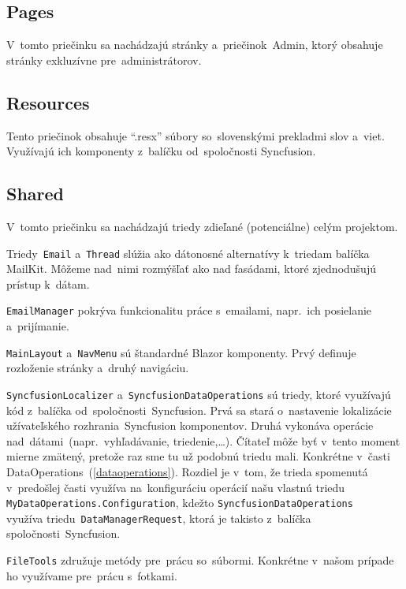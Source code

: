 \subsection{Pages}

V~tomto priečinku sa nachádzajú stránky a~priečinok~Admin, ktorý obsahuje stránky exkluzívne pre~administrátorov.

\subsection{Resources}

Tento priečinok obsahuje ``.resx'' súbory so~slovenskými prekladmi slov a~viet. Využívajú ich komponenty z~balíčku od~spoločnosti Syncfusion.

\subsection{Shared}

V~tomto priečinku sa nachádzajú triedy zdieľané (potenciálne) celým projektom.

Triedy~\verb|Email| a~\verb|Thread| slúžia ako dátonosné alternatívy k~triedam balíčka MailKit. Môžeme nad~nimi rozmýšľať ako nad fasádami, ktoré zjednodušujú prístup k~dátam.

\verb|EmailManager| pokrýva funkcionalitu práce s~emailami, napr.~ich posielanie a~prijímanie.

\verb|MainLayout| a~\verb|NavMenu| sú štandardné Blazor komponenty. Prvý definuje rozloženie stránky a~druhý navigáciu.

\verb|SyncfusionLocalizer| a~\verb|SyncfusionDataOperations| sú triedy, ktoré využívajú kód z~balíčka od~spoločnosti~Syncfusion. Prvá sa stará o~nastavenie lokalizácie užívateľského rozhrania~Syncfusion komponentov. Druhá vykonáva operácie nad~dátami~(napr.~vyhľadávanie, triedenie,\dots). Čítateľ môže byť v~tento moment mierne zmätený, pretože raz sme tu už podobnú triedu mali. Konkrétne v~časti DataOperations~(\ref{dataoperations}). Rozdiel je v~tom, že trieda spomenutá v~predošlej časti využíva na~konfiguráciu operácií našu vlastnú triedu\\\verb|MyDataOperations.Configuration|, kdežto \verb|SyncfusionDataOperations|\\využíva triedu~\verb|DataManagerRequest|, ktorá je takisto z~balíčka spoločnosti~Syncfusion.

\verb|FileTools| združuje metódy pre~prácu so~súbormi. Konkrétne v~našom prípade ho využívame pre~prácu s~fotkami.

